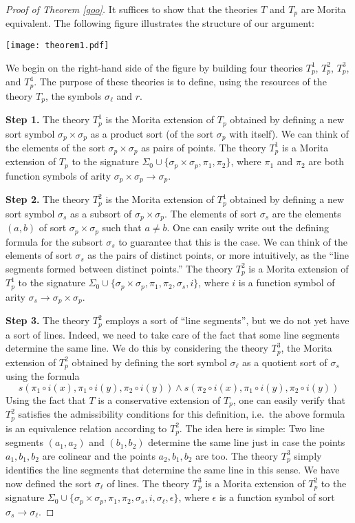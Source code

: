 \begin{proof}[Proof of Theorem \ref{goo}]
  It suffices to show that the theories $T$ and $T_p$ are Morita
  equivalent. The following figure illustrates the structure of our
  argument:
\begin{center}
\texttt{[image: theorem1.pdf]}
\end{center}
We begin on the right-hand side of the figure by building four
theories $T_p^1$, $T_p^2$, $T_p^3$, and $T_p^4$. The purpose of these
theories is to define, using the resources of the theory $T_p$, the
symbols $\sigma_\ell$ and $r$.

\textbf{Step 1.} The theory $T_p^1$ is the Morita extension of $T_p$
obtained by defining a new sort symbol $\sigma_p\times\sigma_p$ as a
product sort (of the sort $\sigma_p$ with itself). We can think of the
elements of the sort $\sigma_p\times\sigma_p$ as pairs of points. The
theory $T_p^1$ is a Morita extension of $T_p$ to the signature
$\Sigma_0\cup\{\sigma_p\times\sigma_p, \pi_1,\pi_2\}$, where $\pi_1$
and $\pi_2$ are both function symbols of arity
$\sigma_p\times\sigma_p\rightarrow\sigma_p$.

\textbf{Step 2.} The theory $T_p^2$ is the Morita extension of $T_p^1$
obtained by defining a new sort symbol $\sigma_{s}$ as a subsort of
$\sigma_p\times\sigma_p$. The elements of sort $\sigma_{s}$ are the
elements $(a,b)$ of sort $\sigma_p\times\sigma_p$ such that $a\neq
b$. One can easily write out the defining formula for the subsort
$\sigma_{s}$ to guarantee that this is the case. We can think of the
elements of sort $\sigma_{s}$ as the pairs of distinct points, or more
intuitively, as the ``line segments formed between distinct points.''
The theory $T_p^2$ is a Morita extension of $T_p^1$ to the signature
$\Sigma_0\cup\{\sigma_p\times\sigma_p, \pi_1,\pi_2, \sigma_{s}, i\}$,
where $i$ is a function symbol of arity
$\sigma_s\rightarrow\sigma_p\times\sigma_p$.

\textbf{Step 3.} The theory $T_p^2$ employs a sort of ``line
segments'', but we do not yet have a sort of lines. Indeed, we need to
take care of the fact that some line segments determine the same
line. We do this by considering the theory $T_p^3$, the Morita
extension of $T_p^2$ obtained by defining the sort symbol
$\sigma_\ell$ as a quotient sort of $\sigma_{s}$ using the formula
$$
s(\pi_1\circ i(x), \pi_1\circ i (y), \pi_2\circ i(y))\land s(\pi_2\circ i(x), \pi_1\circ i (y), \pi_2\circ i(y))
$$
Using the fact that $T$ is a conservative extension of $T_p$, one can
easily verify that $T_p^2$ satisfies the admissibility conditions for
this definition, i.e.~the above formula is an equivalence relation
according to $T_p^2$. The idea here is simple: Two line segments
$(a_1, a_2)$ and $(b_1, b_2)$ determine the same line just in case the
points $a_1, b_1, b_2$ are colinear and the points $a_2, b_1, b_2$ are
too. The theory $T_p^3$ simply identifies the line segments that
determine the same line in this sense. We have now defined the sort
$\sigma_\ell$ of lines. The theory $T_p^3$ is a Morita extension of
$T_p^2$ to the signature
$\Sigma_0\cup\{\sigma_p\times\sigma_p, \pi_1,\pi_2, \sigma_{s}, i,
\sigma_\ell, \epsilon\}$, where $\epsilon$ is a function symbol of
sort $\sigma_s\rightarrow\sigma_\ell$.



\end{proof}
